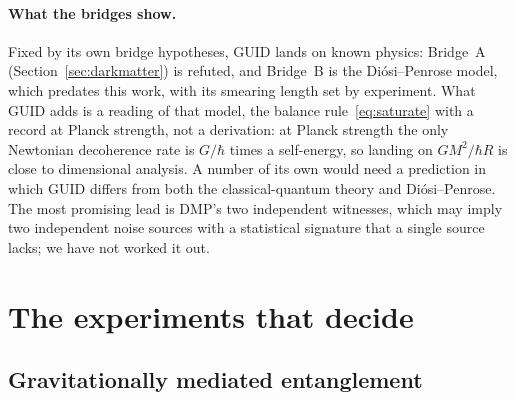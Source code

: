 \paragraph{What the bridges show.} Fixed by its own bridge hypotheses, GUID lands on known physics: Bridge~A (Section~\ref{sec:darkmatter})
is refuted, and Bridge~B is the Di\'osi--Penrose model, which predates this work, with its smearing length set by experiment. What GUID
adds is a reading of that model, the balance rule~\eqref{eq:saturate} with a record at Planck strength, not a derivation: at Planck
strength the only Newtonian decoherence rate is $G/\hbar$ times a self-energy, so landing on $GM^2/\hbar R$ is close to dimensional
analysis. A number of its own would need a prediction in which GUID differs from
both the classical-quantum theory and Di\'osi--Penrose. The most promising lead is DMP's two independent witnesses, which may imply two
independent noise sources with a statistical signature that a single source lacks; we have not worked it out.

\section{The experiments that decide}\label{sec:exp}

\subsection{Gravitationally mediated entanglement}

